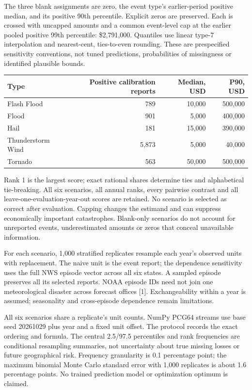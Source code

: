 \documentclass[11pt,letterpaper]{article}
\begin{document}
The three blank assignments are zero, the event type's earlier-period positive median, and its positive 90th percentile. Explicit zeros are preserved. Each is crossed with uncapped amounts and a common event-level cap at the earlier pooled positive 99th percentile: \$2,791,000. Quantiles use linear type-7 interpolation and nearest-cent, ties-to-even rounding. These are prespecified sensitivity conventions, not tuned predictions, probabilities of missingness or identified plausible bounds.

\begin{center}\small
\begin{tabular}{lrrr}\toprule
Type & Positive calibration reports & Median, USD & P90, USD\\\midrule
Flash Flood & 789 & 10,000 & 500,000\\
Flood & 901 & 5,000 & 400,000\\
Hail & 181 & 15,000 & 390,000\\
Thunderstorm Wind & 5,873 & 5,000 & 40,000\\
Tornado & 563 & 50,000 & 500,000\\\bottomrule
\end{tabular}
\end{center}

Rank 1 is the largest score; exact rational shares determine ties and alphabetical tie-breaking. All six scenarios, all annual ranks, every pairwise contrast and all leave-one-evaluation-year-out scores are retained. No scenario is selected as correct after evaluation. Capping changes the estimand and can suppress economically important catastrophes. Blank-only scenarios do not account for unreported events, underestimated amounts or zeros that conceal unavailable information.

For each scenario, 1,000 stratified replicates resample each year's observed units with replacement. The naive unit is the event report; the dependence sensitivity uses the full NWS episode vector across all six states. A sampled episode preserves all its selected reports. NOAA episode IDs need not join one meteorological disaster across forecast offices [1]. Exchangeability within a year is assumed; seasonality and cross-episode dependence remain limitations.

All six scenarios share a replicate's unit counts. NumPy PCG64 streams use base seed 20261029 plus year and a fixed unit offset. The protocol records the exact ordering and formula. The central 2.5/97.5 percentiles and rank frequencies are conditional resampling summaries, not uncertainty about true missing losses or future geographical risk. Frequency granularity is 0.1 percentage point; the maximum binomial Monte Carlo standard error with 1,000 replicates is about 1.6 percentage points. No trained prediction model or optimization optimum is claimed.
\end{document}
